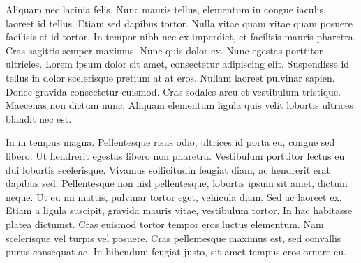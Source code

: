 \documentclass[12pt]{article}
\begin{document}
Aliquam nec lacinia felis. Nunc mauris tellus, elementum in congue iaculis, laoreet id tellus. Etiam sed dapibus tortor. Nulla vitae quam vitae quam posuere facilisis et id tortor. In tempor nibh nec ex imperdiet, et facilisis mauris pharetra. Cras sagittis semper maximus. Nunc quis dolor ex. Nunc egestas porttitor ultricies. Lorem ipsum dolor sit amet, consectetur adipiscing elit. Suspendisse id tellus in dolor scelerisque pretium at at eros. Nullam laoreet pulvinar sapien. Donec gravida consectetur euismod. Cras sodales arcu et vestibulum tristique. Maecenas non dictum nunc. Aliquam elementum ligula quis velit lobortis ultrices blandit nec est.

In in tempus magna. Pellentesque risus odio, ultrices id porta eu, congue sed libero. Ut hendrerit egestas libero non pharetra. Vestibulum porttitor lectus eu dui lobortis scelerisque. Vivamus sollicitudin feugiat diam, ac hendrerit erat dapibus sed. Pellentesque non nisl pellentesque, lobortis ipsum sit amet, dictum neque. Ut eu mi mattis, pulvinar tortor eget, vehicula diam. Sed ac laoreet ex. Etiam a ligula suscipit, gravida mauris vitae, vestibulum tortor. In hac habitasse platea dictumst. Cras euismod tortor tempor eros luctus elementum. Nam scelerisque vel turpis vel posuere. Cras pellentesque maximus est, sed convallis purus consequat ac. In bibendum feugiat justo, sit amet tempus eros ornare eu.
\end{document}
